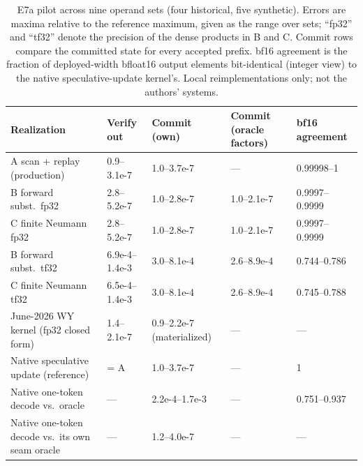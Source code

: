 \documentclass[conference]{IEEEtran}
\begin{document}
\begin{table}[t]
\caption{E7a pilot across nine operand sets (four historical, five synthetic). Errors are maxima relative to the reference maximum, given as the range over sets; ``fp32'' and ``tf32'' denote the precision of the dense products in B and C. Commit rows compare the committed state for every accepted prefix. bf16 agreement is the fraction of deployed-width bfloat16 output elements bit-identical (integer view) to the native speculative-update kernel's. Local reimplementations only; not the authors' systems.}
\label{tab:e7a}
\centering\footnotesize
\begin{tabularx}{\columnwidth}{@{}lYYYY@{}}
\toprule
Realization & Verify out & Commit (own) & Commit (oracle factors) & bf16 agreement \\
\midrule
A scan + replay (production) & 0.9--3.1e-7 & 1.0--3.7e-7 & --- & 0.99998--1 \\
B forward subst.\ fp32 & 2.8--5.2e-7 & 1.0--2.8e-7 & 1.0--2.1e-7 & 0.9997--0.9999 \\
C finite Neumann fp32 & 2.8--5.2e-7 & 1.0--2.8e-7 & 1.0--2.1e-7 & 0.9997--0.9999 \\
B forward subst.\ tf32 & 6.9e-4--1.4e-3 & 3.0--8.1e-4 & 2.6--8.9e-4 & 0.744--0.786 \\
C finite Neumann tf32 & 6.5e-4--1.4e-3 & 3.0--8.1e-4 & 2.6--8.9e-4 & 0.745--0.788 \\
June-2026 WY kernel (fp32 closed form) & 1.4--2.1e-7 & 0.9--2.2e-7 (materialized) & --- & --- \\
\midrule
Native speculative update (reference) & = A & 1.0--3.7e-7 & --- & 1 \\
Native one-token decode vs.\ oracle & --- & 2.2e-4--1.7e-3 & --- & 0.751--0.937 \\
Native one-token decode vs.\ its own seam oracle & --- & 1.2--4.0e-7 & --- & --- \\
\bottomrule
\end{tabularx}
\end{table}
\end{document}
